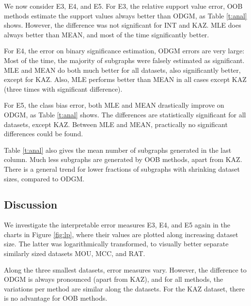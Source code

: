 \documentclass{sig-alternate}
\begin{document}
We now consider E3, E4, and E5. 
For E3, the relative support value error,
OOB methods estimate the support values always better than ODGM, as Table \ref{t:anal} shows. However, the difference was not significant for INT and KAZ.
MLE does always better than MEAN, and most of the time significantly better.

For E4, the error on binary significance estimation, ODGM errors are very large:
Most of the time, the majority of subgraphs were falsely estimated as significant. 
MLE and MEAN do both much better for all datasets, also significantly better, except for KAZ. 
Also, MLE performs better than MEAN in
all cases except KAZ (three times with significant difference). 

For E5, the class bias error, both MLE and MEAN drastically improve on ODGM, as
Table \ref{t:anal} shows. The differences
are statistically significant for all datasets, except KAZ. Between MLE and MEAN, practically no significant differences could be found.

Table \ref{t:anal} also gives the mean number of subgraphs generated in the
last column. Much less subgraphs are generated by OOB methods, apart from KAZ. 
There is a general trend for lower fractions of subgraphs
with shrinking dataset sizes, compared to ODGM. 

\subsection{Discussion}

We investigate the interpretable error measures E3, E4, and E5 again in
the charts in Figure \ref{fig:lp}, where their values are plotted along
increasing dataset size. The latter was logarithmically transformed, to
visually better separate similarly sized datasets MOU, MCC, and RAT. 

Along the three smallest datasets, error measures vary. However, the difference
to ODGM is always pronounced (apart from KAZ), and for all methods, the variations per method
are similar along the datasets. For the KAZ dataset, there is no advantage for OOB methods.
\end{document}
